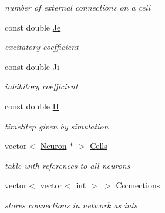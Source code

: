 \begin{DoxyCompactItemize}
\begin{DoxyCompactList}\small\item\em number of external connections on a cell \end{DoxyCompactList}\item 
\hypertarget{classNetwork_afe751f0c7727cf5cf1a4eb59cca4f333}{const double \hyperlink{classNetwork_afe751f0c7727cf5cf1a4eb59cca4f333}{Je}}\label{classNetwork_afe751f0c7727cf5cf1a4eb59cca4f333}

\begin{DoxyCompactList}\small\item\em excitatory coefficient \end{DoxyCompactList}\item 
\hypertarget{classNetwork_a2ff8e1c63c99d9d5d23bc091c501cdae}{const double \hyperlink{classNetwork_a2ff8e1c63c99d9d5d23bc091c501cdae}{Ji}}\label{classNetwork_a2ff8e1c63c99d9d5d23bc091c501cdae}

\begin{DoxyCompactList}\small\item\em inhibitory coefficient \end{DoxyCompactList}\item 
\hypertarget{classNetwork_ae17f3b80498aa6b28f508b9e8ba8cef3}{const double \hyperlink{classNetwork_ae17f3b80498aa6b28f508b9e8ba8cef3}{H}}\label{classNetwork_ae17f3b80498aa6b28f508b9e8ba8cef3}

\begin{DoxyCompactList}\small\item\em time\-Step given by simulation \end{DoxyCompactList}\item 
\hypertarget{classNetwork_a757f1e80b7ff1f43b9ffd2395df673ce}{vector$<$ \hyperlink{classNeuron}{Neuron} $\ast$ $>$ \hyperlink{classNetwork_a757f1e80b7ff1f43b9ffd2395df673ce}{Cells}}\label{classNetwork_a757f1e80b7ff1f43b9ffd2395df673ce}

\begin{DoxyCompactList}\small\item\em table with references to all neurons \end{DoxyCompactList}\item 
\hypertarget{classNetwork_a60511ad25cea8d6e122382f1cf686f24}{vector$<$ vector$<$ int $>$ $>$ \hyperlink{classNetwork_a60511ad25cea8d6e122382f1cf686f24}{Connections}}\label{classNetwork_a60511ad25cea8d6e122382f1cf686f24}

\begin{DoxyCompactList}\small\item\em stores connections in network as ints \end{DoxyCompactList}\end{DoxyCompactItemize}


